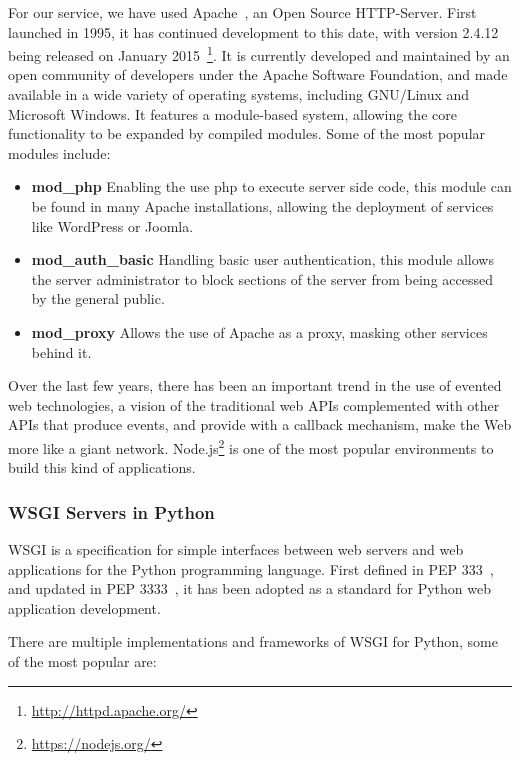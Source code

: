 For our service, we have used Apache~\cite{apacheabout}, an Open Source HTTP-Server. First launched in 1995, it has continued development to this date, with version 2.4.12 being released on January 2015~\footnote{\url{http://httpd.apache.org/}}. It is currently developed and maintained by an open community of developers under the Apache Software Foundation, and made available in a wide variety of operating systems, including GNU/Linux and Microsoft Windows\textregistered. It features a module-based system, allowing the core functionality to be expanded by compiled modules. Some of the most popular modules include:

\begin{itemize}%
 \item \textbf{mod\_php} Enabling the use php to execute server side code, this module can be found in many Apache installations, allowing the deployment of services like WordPress or Joomla.
 \item \textbf{mod\_auth\_basic} Handling basic user authentication, this module allows the server administrator to block sections of the server from being accessed by the general public.
 \item \textbf{mod\_proxy} Allows the use of Apache as a proxy, masking other services behind it.
\end{itemize}

Over the last few years, there has been an important trend in the use of evented web technologies, a vision of the traditional web APIs complemented with other APIs that produce events, and provide with a callback mechanism, make the Web more like a giant network. Node.js\footnote{\url{https://nodejs.org/}} is one of the most popular environments to build this kind of applications.

\subsubsection{WSGI Servers in Python}

\ac{WSGI} is a specification for simple interfaces between web servers and web applications for the Python programming language. First defined in PEP 333~\cite{pep0333}, and updated in PEP 3333~\cite{pep3333}, it has been adopted as a standard for Python web application development.

There are multiple implementations and frameworks of WSGI for Python, some of the most popular are:

